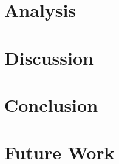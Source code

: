 \documentclass{memoir}
\begin{document}
\chapter{Analysis}

\chapter{Discussion}

\chapter{Conclusion}

\chapter{Future Work}





\end{document}
